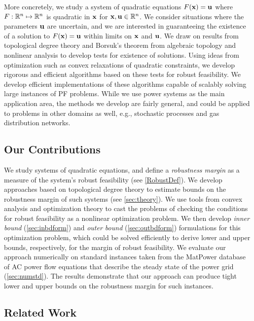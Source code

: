 \medskip
More concretely, we study a system of quadratic equations $F(\mathbf{x})=\mathbf{u}$ where $F: \mathbb{R}^n \mapsto \mathbb{R}^n$ is quadratic in $\mathbf{x}$ for $\mathbf{x},\mathbf{u} \in \mathbb{R}^n$.
  We consider situations where the parameters $\mathbf{u}$ are uncertain, and we are interested in guaranteeing the existence of a solution to $F(\mathbf{x}) = \mathbf{u}$ within limits on $\mathbf{x}$ and $\mathbf{u}$.
We draw on results from topological degree theory and Borsuk's theorem from algebraic topology and nonlinear analysis to develop tests for existence of solutions.
Using ideas from optimization such as convex relaxations of quadratic constraints, we develop rigorous and efficient algorithms based on these tests for robust feasibility.
We develop efficient implementations of these algorithms capable of scalably solving large instances of PF problems.
While we use power systems as the main application area, the methods we develop are fairly general, and could be applied to problems in other domains as well, e.g., stochastic processes and gas distribution networks.

\subsection{Our Contributions}
  We study systems of quadratic equations, and define a \emph{robustness margin} as a measure of the system's robust feasibility (see \cref{RobustDef}).
  We develop approaches based on topological degree theory to estimate bounds on the robustness margin of such systems (see \cref{sec:theory}).
  We use tools from convex analysis and optimization theory to cast the problems of checking the conditions for robust feasibility as a nonlinear optimization problem.
  We then develop \emph{inner bound} (\cref{sec:inbdform}) and \emph{outer bound} (\cref{sec:outbdform}) formulations for this optimization problem, which could be solved efficiently to derive lower and upper bounds, respectively, for the margin of robust feasibility.
  We evaluate our approach numerically on standard instances taken from the MatPower database of AC power flow equations that describe the steady state of the power grid (\cref{sec:numstd}).
  The results demonstrate that our approach can produce tight lower and upper bounds on the robustness margin for such instances.

\subsection{Related Work}

